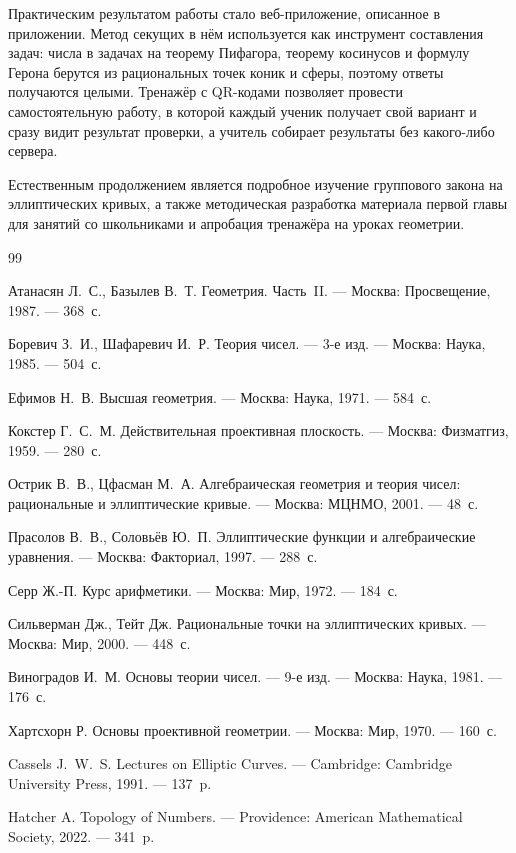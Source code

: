 \documentclass[a4paper,14pt]{extreport}
\theoremstyle{definition}
\begin{document}
Практическим результатом работы стало веб-приложение, описанное в приложении.
Метод секущих в нём используется как инструмент составления задач: числа в
задачах на теорему Пифагора, теорему косинусов и формулу Герона берутся из
рациональных точек коник и сферы, поэтому ответы получаются целыми. Тренажёр
с QR-кодами позволяет провести самостоятельную работу, в которой каждый ученик
получает свой вариант и сразу видит результат проверки, а учитель собирает
результаты без какого-либо сервера.

Естественным продолжением является подробное изучение группового закона на
эллиптических кривых, а также методическая разработка материала первой главы для
занятий со школьниками и апробация тренажёра на уроках геометрии.

\renewcommand{\bibname}{СПИСОК ЛИТЕРАТУРЫ}
\begin{thebibliography}{99}

 Атанасян Л.~С., Базылев В.~Т. Геометрия. Часть~II. ---
  Москва: Просвещение, 1987. --- 368~с.

 Боревич З.~И., Шафаревич И.~Р. Теория чисел. --- 3-е изд. ---
  Москва: Наука, 1985. --- 504~с.

 Ефимов Н.~В. Высшая геометрия. --- Москва: Наука, 1971. ---
  584~с.

 Кокстер Г.~С.~М. Действительная проективная плоскость. ---
  Москва: Физматгиз, 1959. --- 280~с.

 Острик В.~В., Цфасман М.~А. Алгебраическая геометрия и теория
  чисел: рациональные и эллиптические кривые. --- Москва: МЦНМО, 2001. --- 48~с.

 Прасолов В.~В., Соловьёв Ю.~П. Эллиптические функции и
  алгебраические уравнения. --- Москва: Факториал, 1997. --- 288~с.

 Серр Ж.-П. Курс арифметики. --- Москва: Мир, 1972. --- 184~с.

 Сильверман Дж., Тейт Дж. Рациональные точки на эллиптических
  кривых. --- Москва: Мир, 2000. --- 448~с.

 Виноградов И.~М. Основы теории чисел. --- 9-е изд. ---
  Москва: Наука, 1981. --- 176~с.

 Хартсхорн Р. Основы проективной геометрии. --- Москва: Мир,
  1970. --- 160~с.

 Cassels J.~W.~S. Lectures on Elliptic Curves. --- Cambridge:
  Cambridge University Press, 1991. --- 137~p.

 Hatcher A. Topology of Numbers. --- Providence: American
  Mathematical Society, 2022. --- 341~p.

\end{thebibliography}
\end{document}
